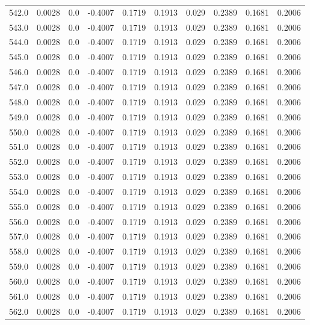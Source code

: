\begin{longtable}{lrrrrrrrrr}
542.0 & 0.0028 & 0.0 & -0.4007 & 0.1719 & 0.1913 & 0.029 & 0.2389 & 0.1681 & 0.2006 \\
543.0 & 0.0028 & 0.0 & -0.4007 & 0.1719 & 0.1913 & 0.029 & 0.2389 & 0.1681 & 0.2006 \\
544.0 & 0.0028 & 0.0 & -0.4007 & 0.1719 & 0.1913 & 0.029 & 0.2389 & 0.1681 & 0.2006 \\
545.0 & 0.0028 & 0.0 & -0.4007 & 0.1719 & 0.1913 & 0.029 & 0.2389 & 0.1681 & 0.2006 \\
546.0 & 0.0028 & 0.0 & -0.4007 & 0.1719 & 0.1913 & 0.029 & 0.2389 & 0.1681 & 0.2006 \\
547.0 & 0.0028 & 0.0 & -0.4007 & 0.1719 & 0.1913 & 0.029 & 0.2389 & 0.1681 & 0.2006 \\
548.0 & 0.0028 & 0.0 & -0.4007 & 0.1719 & 0.1913 & 0.029 & 0.2389 & 0.1681 & 0.2006 \\
549.0 & 0.0028 & 0.0 & -0.4007 & 0.1719 & 0.1913 & 0.029 & 0.2389 & 0.1681 & 0.2006 \\
550.0 & 0.0028 & 0.0 & -0.4007 & 0.1719 & 0.1913 & 0.029 & 0.2389 & 0.1681 & 0.2006 \\
551.0 & 0.0028 & 0.0 & -0.4007 & 0.1719 & 0.1913 & 0.029 & 0.2389 & 0.1681 & 0.2006 \\
552.0 & 0.0028 & 0.0 & -0.4007 & 0.1719 & 0.1913 & 0.029 & 0.2389 & 0.1681 & 0.2006 \\
553.0 & 0.0028 & 0.0 & -0.4007 & 0.1719 & 0.1913 & 0.029 & 0.2389 & 0.1681 & 0.2006 \\
554.0 & 0.0028 & 0.0 & -0.4007 & 0.1719 & 0.1913 & 0.029 & 0.2389 & 0.1681 & 0.2006 \\
555.0 & 0.0028 & 0.0 & -0.4007 & 0.1719 & 0.1913 & 0.029 & 0.2389 & 0.1681 & 0.2006 \\
556.0 & 0.0028 & 0.0 & -0.4007 & 0.1719 & 0.1913 & 0.029 & 0.2389 & 0.1681 & 0.2006 \\
557.0 & 0.0028 & 0.0 & -0.4007 & 0.1719 & 0.1913 & 0.029 & 0.2389 & 0.1681 & 0.2006 \\
558.0 & 0.0028 & 0.0 & -0.4007 & 0.1719 & 0.1913 & 0.029 & 0.2389 & 0.1681 & 0.2006 \\
559.0 & 0.0028 & 0.0 & -0.4007 & 0.1719 & 0.1913 & 0.029 & 0.2389 & 0.1681 & 0.2006 \\
560.0 & 0.0028 & 0.0 & -0.4007 & 0.1719 & 0.1913 & 0.029 & 0.2389 & 0.1681 & 0.2006 \\
561.0 & 0.0028 & 0.0 & -0.4007 & 0.1719 & 0.1913 & 0.029 & 0.2389 & 0.1681 & 0.2006 \\
562.0 & 0.0028 & 0.0 & -0.4007 & 0.1719 & 0.1913 & 0.029 & 0.2389 & 0.1681 & 0.2006 \\

\end{longtable}
